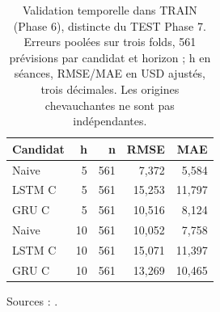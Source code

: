 \begin{table}[!htbp]
\centering
\caption{Validation temporelle dans TRAIN (Phase 6), distincte du TEST Phase 7. Erreurs poolées sur trois folds, 561 prévisions par candidat et horizon ; h en séances, RMSE/MAE en USD ajustés, trois décimales. Les origines chevauchantes ne sont pas indépendantes.}
\label{tab:neural_validation}
\small
\setlength{\tabcolsep}{4pt}
\renewcommand{\arraystretch}{1.16}
\begin{tabularx}{\linewidth}{Xrrrr}
\toprule
\textbf{Candidat} & \textbf{h} & \textbf{n} & \textbf{RMSE} & \textbf{MAE} \\
\midrule
Naive & 5 & 561 & 7,372 & 5,584 \\
LSTM C & 5 & 561 & 15,253 & 11,797 \\
GRU C & 5 & 561 & 10,516 & 8,124 \\
Naive & 10 & 561 & 10,052 & 7,758 \\
LSTM C & 10 & 561 & 15,071 & 11,397 \\
GRU C & 10 & 561 & 13,269 & 10,465 \\
\bottomrule
\end{tabularx}
\par\smallskip
\begin{minipage}{\linewidth}\footnotesize Sources : .
\end{minipage}
\end{table}
